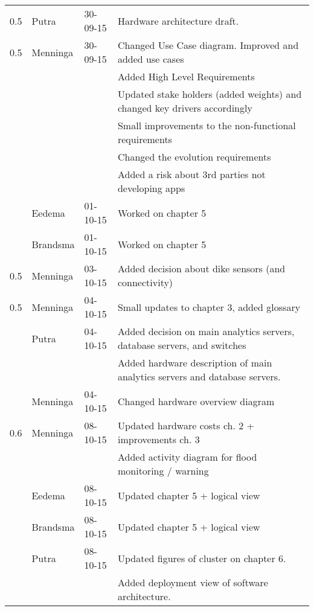 \begin{longtable}{L{} L{} L{} L{}}
    0.5 & Putra     & 30-09-15 & Hardware architecture draft.  \\
    0.5 & Menninga  & 30-09-15 & Changed Use Case diagram. Improved and added use cases \\
        &           &          & Added High Level Requirements \\
        &           &          & Updated stake holders (added weights) and changed key drivers accordingly \\
        &           &          & Small improvements to the non-functional requirements \\
        &           &          & Changed the evolution requirements \\
        &           &          & Added a risk about 3rd parties not developing apps \\
        & Eedema    & 01-10-15 & Worked on chapter 5 \\
        & Brandsma  & 01-10-15 & Worked on chapter 5 \\
    0.5 & Menninga  & 03-10-15 & Added decision about dike sensors (and connectivity) \\
    0.5 & Menninga  & 04-10-15 & Small updates to chapter 3, added glossary \\
        & Putra     & 04-10-15 & Added decision on main analytics servers, database servers, and switches \\
        &           &          & Added hardware description of main analytics servers and database servers. \\
        & Menninga  & 04-10-15 & Changed hardware overview diagram \\
	\midrule
    0.6 & Menninga  & 08-10-15 & Updated hardware costs ch. 2 + improvements ch. 3 \\
        &           &          & Added activity diagram for flood monitoring / warning \\
        & Eedema    & 08-10-15 & Updated chapter 5 + logical view \\
        & Brandsma  & 08-10-15 & Updated chapter 5 + logical view \\
        & Putra     & 08-10-15 & Updated figures of cluster on chapter 6.\\
        &           &          & Added deployment view of software architecture.\\
    
    \bottomrule
\end{longtable}